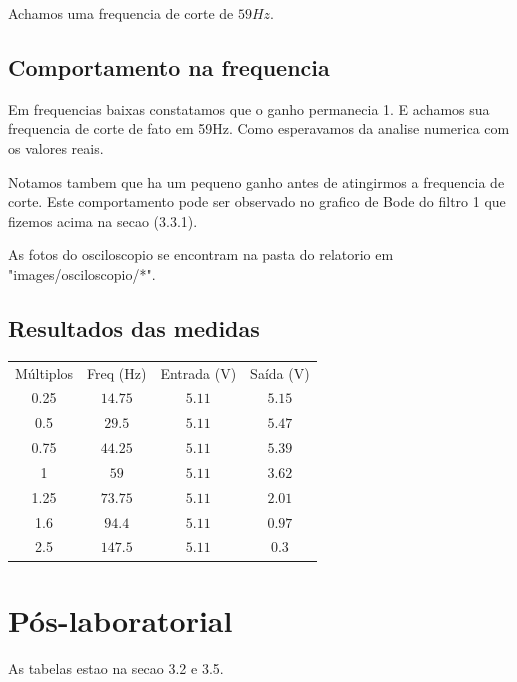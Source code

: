 \documentclass[12pt,twoside, a4paper, twocolumn]{article}
\begin{document}
Achamos uma frequencia de corte de $59Hz$.


\pagebreak



\subsection{Comportamento na frequencia}

Em frequencias baixas constatamos que o ganho permanecia 1. E achamos sua frequencia de corte de fato em 59Hz. Como esperavamos da analise numerica com os valores reais.

Notamos tambem que ha um pequeno ganho antes de atingirmos a frequencia de corte. Este comportamento pode ser observado no grafico de Bode do filtro 1 que fizemos acima na secao (3.3.1).

As fotos do osciloscopio se encontram na pasta do relatorio em "images/osciloscopio/*".


\subsection{Resultados das medidas}
\begin{center}
    \begin{tabular}{ |c|c|c|c| }
        \hline
        Múltiplos & Freq (Hz) & Entrada (V) & Saída (V) \\
        0.25      & $14.75$   & $5.11$      & $5.15$    \\
        0.5       & $29.5$    & $5.11$      & $5.47$    \\
        0.75      & $44.25$   & $5.11$      & $5.39$    \\
        1         & $59$      & $5.11$      & $3.62$    \\
        1.25      & $73.75$   & $5.11$      & $2.01$    \\
        1.6       & $94.4$    & $5.11$      & $0.97$    \\
        2.5       & $147.5$   & $5.11$      & $0.3$     \\
        \hline
    \end{tabular}
\end{center}


\newpage


\section{Pós-laboratorial}

As tabelas estao na secao 3.2 e 3.5.
\end{document}
